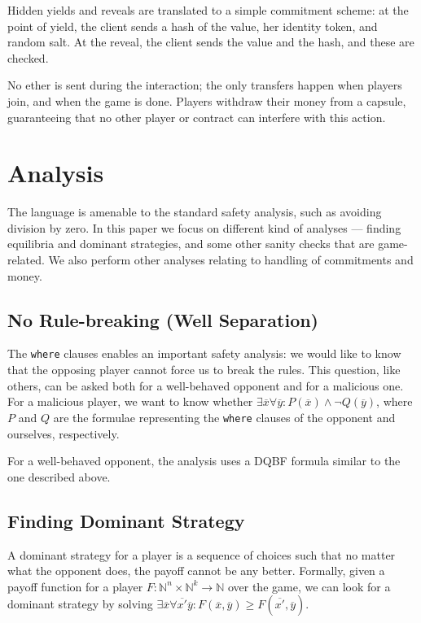 \documentclass[acmsmall,review,anonymous]{acmart}\settopmatter{printfolios=true,printccs=false,printacmref=false}
\begin{document}
Hidden yields and reveals are translated to a simple commitment scheme: at the point of yield, the client sends a hash of the value, her identity token, and random salt. At the reveal, the client sends the value and the hash, and these are checked.

No ether is sent during the interaction; the only transfers happen when players join, and when the game is done. Players withdraw their money from a capsule, guaranteeing that no other player or contract can interfere with this action.

\section{Analysis}
The language is amenable to the standard safety analysis, such as avoiding division by zero. In this paper we focus on different kind of analyses --- finding equilibria and dominant strategies, and some other sanity checks that are game-related. We also perform other analyses relating to handling of commitments and money.

\subsection{No Rule-breaking (Well Separation)}
The \texttt{where} clauses enables an important safety analysis: we would like to know that the opposing player cannot force us to break the rules. This question, like others, can be asked both for a well-behaved opponent and for a malicious one. For a malicious player, we want to know whether $\exists \overline{x} \forall \overline{y}: P(\overline{x})\wedge \neg Q(\overline{y})$, where $P$ and $Q$ are the formulae representing the \texttt{where} clauses of the opponent and ourselves, respectively.

For a well-behaved opponent, the analysis uses a DQBF formula similar to the one described above.

\subsection{Finding Dominant Strategy}
A dominant strategy for a player is a sequence of choices such that no matter what the opponent does, the payoff cannot be any better. Formally, given a payoff function for a player
$F : \mathbb{N}^n \times \mathbb{N}^k \rightarrow \mathbb{N}$
over the game, we can look for a dominant strategy by solving
$\exists \overline{x} \forall \overline{x'} \overline{y}: F(\overline{x}, \overline{y})\geq F(\overline{x'}, \overline{y})$.
\end{document}
